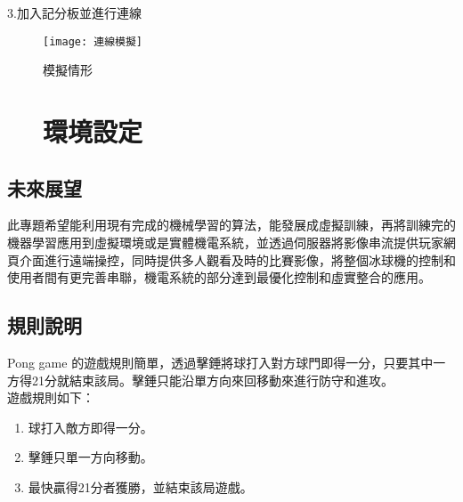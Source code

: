 3.加入記分板並進行連線\\
\begin{figure}[hbt!]
\begin{center}
\texttt{[image: 連線模擬]}
\caption{\Large 模擬情形}\label{fig.連線模擬}
\end{center}
\end{figure}
\newpage
 
 \begin{figure}[hbt!]
 \chapter{環境設定}
 \end{figure}
\renewcommand{\baselinestretch}{10.0} %
\setcounter{page}{1}  %
\fontsize{14pt}{2.5pt}\sectionef

\section{未來展望}
此專題希望能利用現有完成的機械學習的算法，能發展成虛擬訓練，再將訓練完的機器學習應用到虛擬環境或是實體機電系統，並透過伺服器將影像串流提供玩家網頁介面進行遠端操控，同時提供多人觀看及時的比賽影像，將整個冰球機的控制和使用者間有更完善串聯，機電系統的部分達到最優化控制和虛實整合的應用。
\section{規則說明}
 Pong game 的遊戲規則簡單，透過擊錘將球打入對方球門即得一分，只要其中一方得21分就結束該局。擊錘只能沿單方向來回移動來進行防守和進攻。\\
遊戲規則如下：
\begin{enumerate}
\item 球打入敵方即得一分。
\item 擊錘只單一方向移動。
\item 最快贏得21分者獲勝，並結束該局遊戲。
\end{enumerate}

\renewcommand{\baselinestretch}{0.5} %